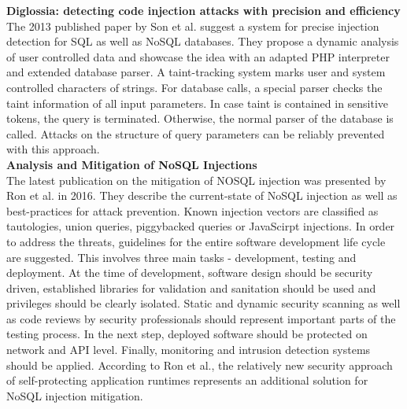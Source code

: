 \textbf{Diglossia: detecting code injection attacks with precision and efficiency} \cite{Son:2013} \\
The 2013 published paper by Son et al. suggest a system for precise injection detection for SQL as well as NoSQL databases. They propose a dynamic analysis of user controlled data and showcase the idea with an adapted PHP interpreter and extended database parser. A taint-tracking system marks user and system controlled characters of strings. For database calls, a special parser checks the taint information of all input parameters. In case taint is contained in sensitive tokens, the query is terminated. Otherwise, the normal parser of the database is called. Attacks on the structure of query parameters can be reliably prevented with this approach.\\

\textbf{Analysis and Mitigation of NoSQL Injections} \cite{Ron:2016} \\
The latest publication on the mitigation of NOSQL injection was presented by Ron et al. in 2016. They describe the current-state of NoSQL injection as well as best-practices for attack prevention. Known injection vectors are classified as tautologies, union queries, piggybacked queries or JavaScirpt injections. In order to address the threats, guidelines for the entire software development life cycle are suggested. This involves three main tasks - development, testing and deployment. At the time of development, software design should be security driven, established libraries for validation and sanitation should be used and privileges should be clearly isolated. Static and dynamic security scanning as well as code reviews by security professionals should represent important parts of the testing process. In the next step, deployed software should be protected on network and API level. Finally, monitoring and intrusion detection systems should be applied. According to Ron et al., the relatively new security approach of self-protecting application runtimes represents an additional solution for NoSQL injection mitigation.\\

